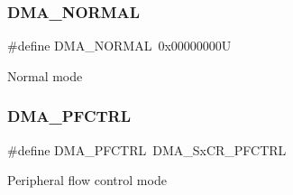 \subsubsection{\texorpdfstring{DMA\_NORMAL}{DMA\_NORMAL}}
{\footnotesize\ttfamily \#define D\+M\+A\+\_\+\+N\+O\+R\+M\+AL~0x00000000U}

Normal mode \mbox{\label{group___d_m_a__mode_ga7974ee645c8e275a2297cf37eec9e022}} 
\subsubsection{\texorpdfstring{DMA\_PFCTRL}{DMA\_PFCTRL}}
{\footnotesize\ttfamily \#define D\+M\+A\+\_\+\+P\+F\+C\+T\+RL~D\+M\+A\+\_\+\+Sx\+C\+R\+\_\+\+P\+F\+C\+T\+RL}

Peripheral flow control mode 
